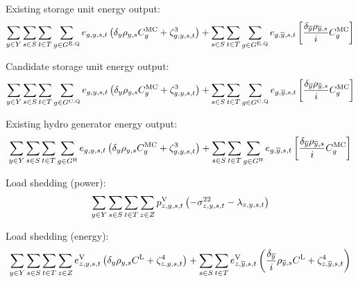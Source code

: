 \documentclass{article}
\newcommand{\sGeneratorsHydro}{G^{\mathrm{H}}}
\newcommand{\sStorageExisting}{G^{\mathrm{E,Q}}}
\newcommand{\sStorageCandidate}{G^{\mathrm{C,Q}}}
\newcommand{\sScenarios}{S}
\newcommand{\sIntervals}{T}
\newcommand{\sZones}{Z}
\newcommand{\iGenerator}{g}
\newcommand{\iYear}{y}
\newcommand{\iYearTerminal}{\overline{\iYear}}
\newcommand{\iScenario}{s}
\newcommand{\iInterval}{t}
\newcommand{\iZone}{z}
\newcommand{\cScenarioDuration}[1][\iYear,\iScenario]{\rho_{#1}}
\newcommand{\cMarginalCost}[1][\iGenerator,\iYear]{C^{\mathrm{MC}}_{#1}}
\newcommand{\cInterestRate}{i}
\newcommand{\cLostLoadCost}{C^{\mathrm{L}}}
\newcommand{\cDiscountRate}[1][\iYear]{\delta_{#1}}
\newcommand{\vEnergy}[1][\iGenerator,\iYear,\iScenario,\iInterval]{e_{#1}}
\newcommand{\vLostLoadEnergy}[1][\iZone,\iYear,\iScenario,\iInterval]{e^{\mathrm{V}}_{#1}}
\newcommand{\vLostLoadPower}[1][\iZone,\iYear,\iScenario,\iInterval]{p^{\mathrm{V}}_{#1}}
\newcommand{\dNonNegativeLostLoad}[1][\iZone,\iYear,\iScenario,\iInterval]{\sigma_{#1}^{22}}
\newcommand{\dPowerBalance}[1][\iZone,\iYear,\iScenario,\iInterval]{\lambda_{#1}}
\newcommand{\dStorageEnergyOutput}[1][\iGenerator,\iYear,\iScenario,\iInterval]{\zeta_{#1}^{3}}
\newcommand{\dLostLoadEnergy}[1][\iZone,\iYear,\iScenario,\iInterval]{\zeta_{#1}^{4}}
\begin{document}
Existing storage unit energy output:
\begin{equation}
	\sumIntervals \sum\limits_{\iGenerator \in \sStorageExisting} \vEnergy \left(\cDiscountRate\cScenarioDuration \cMarginalCost[\iGenerator] + \dStorageEnergyOutput \right) + \sum\limits_{\iScenario \in \sScenarios} \sum\limits_{\iInterval \in \sIntervals} \sum\limits_{\iGenerator \in \sStorageExisting} \vEnergy[\iGenerator,\iYearTerminal,\iScenario,\iInterval] \left[ \frac{\cDiscountRate[\iYearTerminal] \cScenarioDuration[\iYearTerminal,\iScenario]}{\cInterestRate} \cMarginalCost[\iGenerator] \right]
\end{equation}

Candidate storage unit energy output:
\begin{equation}
	\sumIntervals \sum\limits_{\iGenerator \in \sStorageCandidate} \vEnergy \left(\cDiscountRate\cScenarioDuration \cMarginalCost[\iGenerator] + \dStorageEnergyOutput \right) + \sum\limits_{\iScenario \in \sScenarios} \sum\limits_{\iInterval \in \sIntervals} \sum\limits_{\iGenerator \in \sStorageCandidate} \vEnergy[\iGenerator,\iYearTerminal,\iScenario,\iInterval] \left[ \frac{\cDiscountRate[\iYearTerminal] \cScenarioDuration[\iYearTerminal,\iScenario]}{\cInterestRate} \cMarginalCost[\iGenerator] \right]
\end{equation}

Existing hydro generator energy output:
\begin{equation}
	\sumIntervals \sum\limits_{\iGenerator \in \sGeneratorsHydro} \vEnergy \left(\cDiscountRate\cScenarioDuration \cMarginalCost[\iGenerator] + \dStorageEnergyOutput \right) + \sum\limits_{\iScenario \in \sScenarios} \sum\limits_{\iInterval \in \sIntervals} \sum\limits_{\iGenerator \in \sGeneratorsHydro} \vEnergy[\iGenerator,\iYearTerminal,\iScenario,\iInterval] \left[ \frac{\cDiscountRate[\iYearTerminal] \cScenarioDuration[\iYearTerminal,\iScenario]}{\cInterestRate} \cMarginalCost[\iGenerator] \right]
\end{equation}

Load shedding (power):
\begin{equation}
	\sumIntervals \sum\limits_{\iZone \in \sZones} \vLostLoadPower \left(- \dNonNegativeLostLoad - \dPowerBalance\right)
\end{equation}

Load shedding (energy):
\begin{equation}
	\sumIntervals \sum\limits_{\iZone \in \sZones} \vLostLoadEnergy \left(\cDiscountRate \cScenarioDuration \cLostLoadCost + \dLostLoadEnergy \right) + \sum\limits_{\iScenario \in \sScenarios}\sum\limits_{\iInterval \in \sIntervals} \vLostLoadEnergy[\iZone,\iYearTerminal,\iScenario,\iInterval] \left( \frac{\cDiscountRate[\iYearTerminal]}{\cInterestRate} \cScenarioDuration[\iYearTerminal,\iScenario] \cLostLoadCost + \dLostLoadEnergy[\iZone,\iYearTerminal,\iScenario,\iInterval] \right)
\end{equation}
\end{document}
